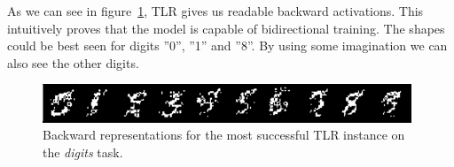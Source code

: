 As we can see in figure~\ref{fig:results-tlr-digits-backward}, TLR gives us readable backward activations. This intuitively proves that the model is capable of bidirectional training. The shapes could be best seen for digits ''0'', ''1'' and ''8''. By using some imagination we can also see the other digits. 

\begin{figure}[H]
  \centering
  \includegraphics[width=0.98\textwidth]{img/tlr-digits.png}    
  \caption{Backward representations for the most successful TLR instance on the \emph{digits} task.}
  \label{fig:results-tlr-digits-backward} 
\end{figure}
